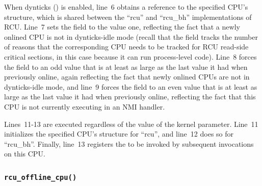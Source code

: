 When dynticks () is enabled, line~6 obtains a
reference to the specified CPU's  structure, which
is shared between the ``rcu'' and ``rcu\_bh'' implementations of RCU.
Line~7 sets the  field to the value one,
reflecting the fact that a newly onlined CPU is not in dynticks-idle
mode (recall that the  field tracks the
number of reasons that the corresponding CPU needs to be tracked for
RCU read-side critical sections, in this case because it can run
process-level code).
Line~8 forces the  field to an odd value that is
at least as large as the last value it had when previously online,
again reflecting the fact that newly onlined CPUs are not in dynticks-idle
mode, and line~9 forces the  field to an even value
that is at least as large as the last value it had when previously
online, reflecting the fact that this CPU is not currently executing
in an NMI handler.

Lines~11-13 are executed regardless of the value of the
 kernel parameter.
Line~11 initializes the specified CPU's  structure
for ``rcu'', and line~12 does so for ``rcu\_bh''.
Finally, line~13 registers the  to be
invoked by subsequent  invocations on this CPU.

\subsubsection{\tt rcu\_offline\_cpu()}
\label{app:rcuimpl:rcutreewt:rcu-offline-cpu}


